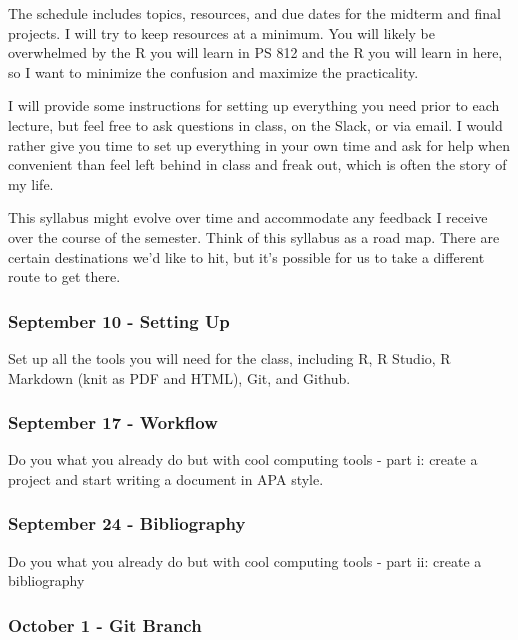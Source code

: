 \documentclass[11pt,]{article}
\begin{document}
The schedule includes topics, resources, and due dates for the midterm
and final projects. I will try to keep resources at a minimum. You will
likely be overwhelmed by the R you will learn in PS 812 and the R you
will learn in here, so I want to minimize the confusion and maximize the
practicality.

I will provide some instructions for setting up everything you need
prior to each lecture, but feel free to ask questions in class, on the
Slack, or via email. I would rather give you time to set up everything
in your own time and ask for help when convenient than feel left behind
in class and freak out, which is often the story of my life.

This syllabus might evolve over time and accommodate any feedback I
receive over the course of the semester. Think of this syllabus as a
road map. There are certain destinations we'd like to hit, but it's
possible for us to take a different route to get there.

\hypertarget{september-10---setting-up}{%
\subsubsection{September 10 - Setting
Up}\label{september-10---setting-up}}

Set up all the tools you will need for the class, including R, R Studio,
R Markdown (knit as PDF and HTML), Git, and Github.

\hypertarget{september-17---workflow}{%
\subsubsection{September 17 - Workflow}\label{september-17---workflow}}

Do you what you already do but with cool computing tools - part i:
create a project and start writing a document in APA style.

\hypertarget{september-24---bibliography}{%
\subsubsection{September 24 -
Bibliography}\label{september-24---bibliography}}

Do you what you already do but with cool computing tools - part ii:
create a bibliography

\hypertarget{october-1---git-branch}{%
\subsubsection{October 1 - Git Branch}\label{october-1---git-branch}}
\end{document}
